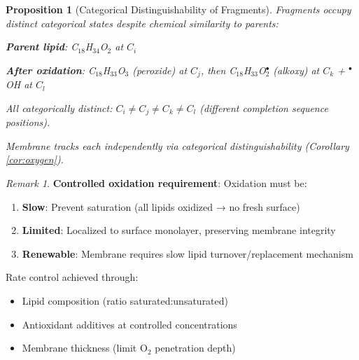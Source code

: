 \documentclass[11pt,a4paper]{article}
\newtheorem{proposition}[theorem]{Proposition}
\theoremstyle{definition}
\theoremstyle{remark}
\newtheorem{remark}[theorem]{Remark}
\begin{document}
\begin{proposition}[Categorical Distinguishability of Fragments]
Fragments occupy distinct categorical states despite chemical similarity to parents:

\textbf{Parent lipid}: C$_{18}$H$_{34}$O$_2$ at $C_i$

\textbf{After oxidation}: C$_{18}$H$_{33}$O$_3$ (peroxide) at $C_j$, then C$_{18}$H$_{33}$O$_2^\bullet$ (alkoxy) at $C_k$ + $^\bullet$OH at $C_l$

All categorically distinct: $C_i \neq C_j \neq C_k \neq C_l$ (different completion sequence positions).

Membrane tracks each independently via categorical distinguishability (Corollary \ref{cor:oxygen}).
\end{proposition}

\begin{remark}
\textbf{Controlled oxidation requirement}: Oxidation must be:
\begin{enumerate}
\item \textbf{Slow}: Prevent saturation (all lipids oxidized → no fresh surface)
\item \textbf{Limited}: Localized to surface monolayer, preserving membrane integrity
\item \textbf{Renewable}: Membrane requires slow lipid turnover/replacement mechanism
\end{enumerate}

Rate control achieved through:
\begin{itemize}
\item Lipid composition (ratio saturated:unsaturated)
\item Antioxidant additives at controlled concentrations
\item Membrane thickness (limit O$_2$ penetration depth)
\end{itemize}
\end{remark}
\end{document}
